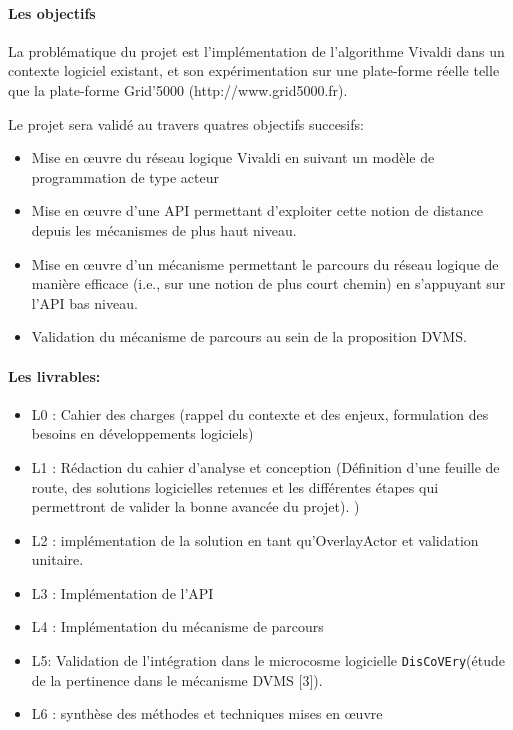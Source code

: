 \documentclass[a4paper,11pt]{article}
\newcommand{\discovery}{\texttt{DisCoVEry}\xspace}
\begin{document}
\begin{note}
\paragraph*{Les objectifs\\}
La problématique du projet est l'implémentation de l'algorithme Vivaldi dans un
contexte logiciel existant, et son expérimentation sur une plate-forme réelle
telle que la plate-forme Grid'5000 (http://www.grid5000.fr).

Le projet sera validé au travers quatres objectifs succesifs:
\begin{itemize}
\item Mise en \oe uvre du réseau logique Vivaldi en suivant un modèle de programmation de type acteur
\item Mise en \oe uvre d'une API permettant d'exploiter cette notion de distance depuis les mécanismes de plus haut niveau. 
\item Mise en \oe uvre d'un mécanisme permettant le parcours du réseau logique de manière efficace (i.e., sur une notion de plus court chemin) en s'appuyant sur l'API bas niveau. 
\item Validation du mécanisme de parcours au sein de la proposition DVMS. 
\end{itemize}

\paragraph*{Les livrables:\\}

\begin{itemize}

\item L0 : Cahier des charges (rappel du contexte et des enjeux, formulation des besoins en développements logiciels)

\item L1 : Rédaction du cahier d'analyse et conception (Définition d'une feuille de route, des solutions logicielles retenues et les différentes étapes qui permettront de valider la bonne avancée du projet). )
\item L2 : implémentation de la solution en tant qu'OverlayActor et validation unitaire.
\item L3 : Implémentation de l'API
\item L4 : Implémentation du mécanisme de parcours
\item L5:  Validation de l'intégration dans le microcosme logicielle \discovery (étude de la pertinence dans le mécanisme DVMS [3]).
\item L6 : synthèse des méthodes et techniques mises en \oe uvre
\end{itemize}


\end{note}
\end{document}
